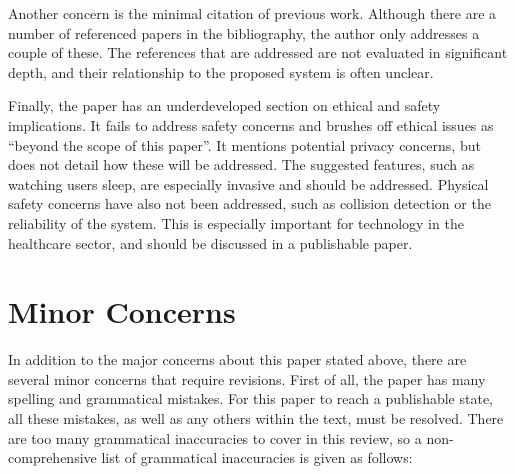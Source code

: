 \documentclass{article}
\theoremstyle{definition}
\begin{document}
Another concern is the minimal citation of previous work.
Although there are a number of referenced papers in the bibliography,
the author only addresses a couple of these.
The references that are addressed are not evaluated in significant depth, and their relationship to the proposed system is often unclear.

Finally, the paper has an underdeveloped section on ethical and safety implications. 
It fails to address safety concerns and brushes off ethical issues as ``beyond the scope of this paper''.
It mentions potential privacy concerns, but does not detail how these will be addressed.
The suggested features, such as watching users sleep, are especially invasive and should be addressed. 
Physical safety concerns have also not been addressed, such as collision detection or the reliability of the system.
This is especially important for technology in the healthcare sector, and should be discussed in a publishable paper.

\section{Minor Concerns}

In addition to the major concerns about this paper stated above, there are several minor concerns that require revisions.
First of all, the paper has many spelling and grammatical mistakes.
For this paper to reach a publishable state, all these mistakes,
as well as any others within the text, must be resolved. 
There are too many grammatical inaccuracies to cover in this review, 
so a non-comprehensive list of grammatical inaccuracies is given as follows:
\end{document}
